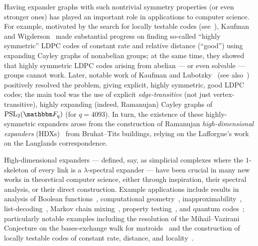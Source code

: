 \documentclass[10pt,a4paper]{article}
\theoremstyle{definition}
\newcommand{\F}{\mathbbm F}
\newcommand{\PSL}{{\mathrm{PSL}}}
\begin{document}
Having expander graphs with such nontrivial symmetry properties (or even stronger ones) has played an important role in applications to computer science.
For example, motivated by the search for locally testable codes (see~\cite{KS08}), Kaufman and Wigderson~\cite{KW16} made substantial progress on finding so-called ``highly symmetric'' LDPC codes of constant rate and relative distance (``good'') using expanding Cayley graphs of nonabelian groups; at the same time, they showed that highly symmetric LDPC codes arising from abelian --- or even solvable --- groups cannot work.
Later, notable work of Kaufman and Lubotzky~\cite{KL12} (see also~\cite{Bec16}) positively resolved the problem, giving explicit, highly symmetric, good LDPC codes; the main tool was the use of explicit \emph{edge-transitive} (not just vertex-transitive), highly expanding (indeed, Ramanujan) Cayley graphs of $\PSL_2(\F_q)$ (for $q = 4093$).
In turn, the existence of these highly-symmetric expanders arose from the construction of Ramanujan \emph{high-dimensional expanders} (HDXs)~\cite{Bal00,CSZ03,Li04,LSV05,LSV05b,Sar04} from Bruhat--Tits buildings, relying on the Lafforgue's work~\cite{Laf02} on the Langlands correspondence.

High-dimensional expanders --- defined, say, as simplicial complexes where the $1$-skeleton of every link is a $\lambda$-spectral expander --- have been crucial in many new works in theoretical computer science, either through inspiration, their spectral analysis, or their direct construction. 
Example applications include results in analysis of Boolean functions~\cite{DDFH18}, computational geometry~\cite{FGLNP12}, inapproximability~\cite{AJT20,DFHT21}, list-decoding~\cite{AJQST20,DHKNT21}, Markov chain mixing~\cite{AL20}, property testing~\cite{DK17,DD19,KM20,KO20}, and quantum codes~\cite{EKZ20,KT21}; particularly notable examples including the resolution of the Mihail--Vazirani Conjecture on the bases-exchange walk for matroids~\cite{ALOV19} and the construction of locally testable codes of constant rate, distance, and locality~\cite{DELLM21,PK21}.

\end{document}
